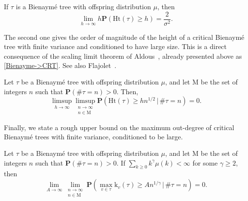 \documentclass[11pt,reqno]{amsart}
\renewcommand{\P}{\mathbf{P}}
\newcommand{\1}{\mathbf{1}}
\newcommand{\0}{\mathbf{0}}
\newcommand{\prob}{\mathbf{P}}
\newcommand{\Ht}{\mathrm{Ht}}
\newcommand{\rk}{\mathrm{k}}
\begin{document}
\begin{prop}
  \label{single_tree_height}
  If $\tau$ is a Bienaymé tree with offspring distribution $\mu$, then
  \[ \lim_{h\to\infty} h\P(\Ht(\tau)\geq h) = \frac{2}{\sigma^2}. \]
\end{prop}

The second one gives the order of magnitude of the height of a critical Bienaymé tree with finite variance and conditioned to have large size. This is a direct consequence of the scaling limit theorem of Aldous~\cite[Theorem~2.23]{aldous1993continuumIII}, already presented above as \eqref{Bienayme->CRT}. See also Flajolet~\cite{flajolet1982average}.

\begin{prop}
\label{prop:conditioned_tree_height}
  Let $\tau$ be a Bienaym\'{e} tree with offspring distribution $\mu$,  and let $\mathrm{M}$ be the set of integers $n$ such that $\P(\#\tau=n)>0$. Then,
  \[\limsup_{h\to\infty}\limsup_{\substack{n\to\infty\\ n\in\mathrm{M}}} \P(\Ht(\tau)\geq h n^{1/2} \,|\, \#\tau=n)=0.\]
\end{prop}

Finally, we state a rough upper bound on the maximum out-degree of critical Bienaymé trees with finite variance, conditioned to be large.

\begin{lem}
\label{lem:maximum_degree}
    Let $\tau$ be a Bienaym\'{e} tree with offspring distribution $\mu$, and let $\mathrm{M}$ be the set of integers $n$ such that $\P(\#\tau=n)>0$. If $\sum_{k\geq 0} k^{\gamma}\mu(k) < \infty$ for some $\gamma \geq 2$, then
    $$
    \lim_{A \to \infty}\lim_{\substack{n \to \infty\\ n\in\mathrm{M}}} \prob\left( \max_{v \in \tau} \rk_v(\tau) \geq An^{1/\gamma} \, \big| \, \#\tau =n \right) = 0.
    $$
\end{lem}
\end{document}
